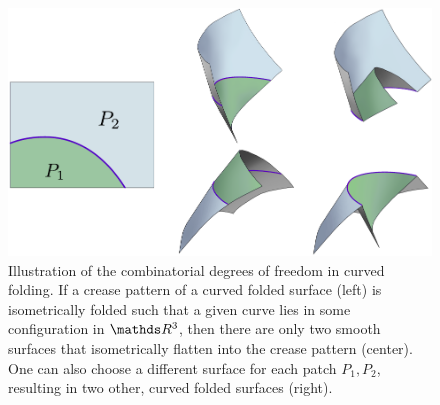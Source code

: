 \begin{figure} [h]
	\centering
	\includegraphics[width=\linewidth]{figures/curved_fold_through_curve_1.pdf}
	\caption{Illustration of the combinatorial degrees of freedom in curved folding. If a crease pattern of a curved folded surface (left) is isometrically folded such that a given curve lies in some configuration in $\R^3$, then there are only two smooth surfaces that isometrically flatten into the crease pattern (center). One can also choose a different surface for each patch $P_1,P_2$, resulting in two other, curved folded surfaces (right).}
	\label{fig:folding_combinatorics}
\end{figure}

